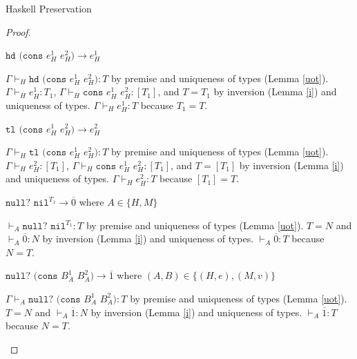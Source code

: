 \begin{theorem}{Haskell Preservation}
\begin{proof}
\begin{case}{\ostlnil}
\end{case}


\begin{case}{\oshdconsh}

$\mathtt{hd}$ $(\mathtt{cons}$ $e_{H}^{1}$ $e_{H}^{2})\rightarrow e_{H}^{1}$

$\Gamma\vdash_{H}\mathtt{hd}$ $(\mathtt{cons}$ $e_{H}^{1}$ $e_{H}^{2}):T$ by premise and uniqueness of types (Lemma \ref{uot}).  $\Gamma\vdash_{H}e_{H}^{1}:T_{1}$, $\Gamma\vdash_{H}\mathtt{cons}$ $e_{H}^{1}$ $e_{H}^{2}:[T_{1}]$, and $T=T_{1}$ by inversion (Lemma \ref{i}) and uniqueness of types.  $\Gamma\vdash_{H}e_{H}^{1}:T$ because $T_{1}=T$.
\end{case}


\begin{case}{\ostlconsh}

$\mathtt{tl}$ $(\mathtt{cons}$ $e_{H}^{1}$ $e_{H}^{2})\rightarrow e_{H}^{2}$

$\Gamma\vdash_{H}\mathtt{tl}$ $(\mathtt{cons}$ $e_{H}^{1}$ $e_{H}^{2}):T$ by premise and uniqueness of types (Lemma \ref{uot}).  $\Gamma\vdash_{H}e_{H}^{2}:[T_{1}]$, $\Gamma\vdash_{H}\mathtt{cons}$ $e_{H}^{1}$ $e_{H}^{2}:[T_{1}]$, and $T=[T_{1}]$ by inversion (Lemma \ref{i}) and uniqueness of types.  $\Gamma\vdash_{H}e_{H}^{2}:T$ because $[T_{1}]=T$.
\end{case}


\begin{case}{\osnullnil}

$\mathtt{null?}$ $\mathtt{nil}^{T_{1}}\rightarrow\overline{0}$ where $A\in\lbrace H,M\rbrace$

$\vdash_{A}\mathtt{null?}$ $\mathtt{nil}^{T_{1}}:T$ by premise and uniqueness of types (Lemma \ref{uot}).  $T=N$ and $\vdash_{A}\overline{0}:N$ by inversion (Lemma \ref{i}) and uniqueness of types.  $\vdash_{A}\overline{0}:T$ because $N=T$.
\end{case}


\begin{case}{\osnullconsh}

$\mathtt{null?}$ $(\mathtt{cons}$ $B_{A}^{1}$ $B_{A}^{2})\rightarrow\overline{1}$ where $(A,B)\in\lbrace(H,e),(M,v)\rbrace$

$\Gamma\vdash_{A}\mathtt{null?}$ $(\mathtt{cons}$ $B_{A}^{1}$ $B_{A}^{2}):T$ by premise and uniqueness of types (Lemma \ref{uot}).  $T=N$ and $\vdash_{A}\overline{1}:N$ by inversion (Lemma \ref{i}) and uniqueness of types.  $\vdash_{A}\overline{1}:T$ because $N=T$.
\end{case}


\end{proof}
\end{theorem}
